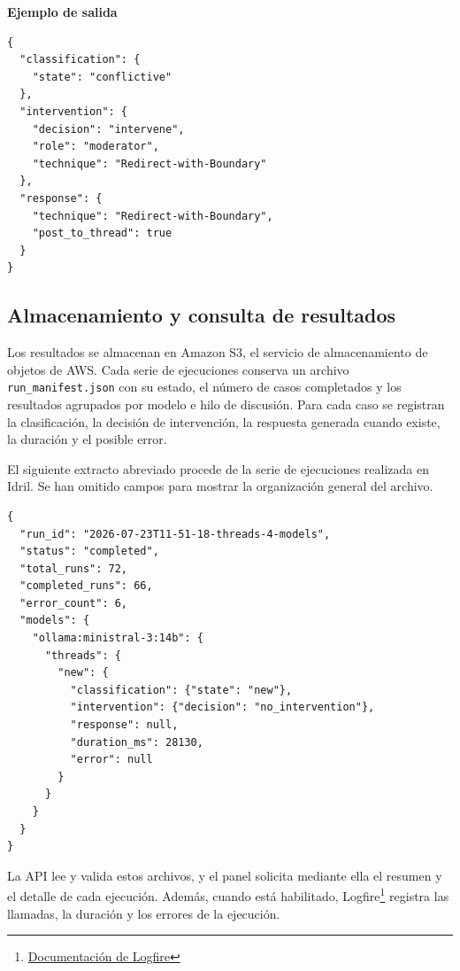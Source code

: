 \textbf{Ejemplo de salida}

\begin{samepage}
\begin{small}
\begin{verbatim}
{
  "classification": {
    "state": "conflictive"
  },
  "intervention": {
    "decision": "intervene",
    "role": "moderator",
    "technique": "Redirect-with-Boundary"
  },
  "response": {
    "technique": "Redirect-with-Boundary",
    "post_to_thread": true
  }
}
\end{verbatim}
\end{small}
\end{samepage}

\subsection{Almacenamiento y consulta de resultados}
\label{sec:almacenamiento-resultados}

Los resultados se almacenan en Amazon S3, el servicio de almacenamiento de objetos de AWS. Cada serie de ejecuciones conserva un archivo \texttt{run\_manifest.json} con su estado, el número de casos completados y los resultados agrupados por modelo e hilo de discusión. Para cada caso se registran la clasificación, la decisión de intervención, la respuesta generada cuando existe, la duración y el posible error.

El siguiente extracto abreviado procede de la serie de ejecuciones realizada en Idril. Se han omitido campos para mostrar la organización general del archivo.

\begin{small}
\begin{verbatim}
{
  "run_id": "2026-07-23T11-51-18-threads-4-models",
  "status": "completed",
  "total_runs": 72,
  "completed_runs": 66,
  "error_count": 6,
  "models": {
    "ollama:ministral-3:14b": {
      "threads": {
        "new": {
          "classification": {"state": "new"},
          "intervention": {"decision": "no_intervention"},
          "response": null,
          "duration_ms": 28130,
          "error": null
        }
      }
    }
  }
}
\end{verbatim}
\end{small}

La API lee y valida estos archivos, y el panel solicita mediante ella el resumen y el detalle de cada ejecución. Además, cuando está habilitado, Logfire\footnote{\href{https://logfire.pydantic.dev/docs/}{Documentación de Logfire}} registra las llamadas, la duración y los errores de la ejecución.

